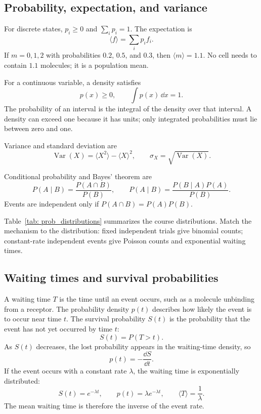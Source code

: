 \subsection{Probability, expectation, and variance}
\label{math:probability}

For discrete states, $p_i\geq0$ and $\sum_i p_i=1$.
The expectation is
\[
    \langle f\rangle=\sum_i p_i f_i.
\]
If $m=0,1,2$ with probabilities $0.2$, $0.5$, and $0.3$, then $\langle m\rangle=1.1$.
No cell needs to contain $1.1$ molecules; it is a population mean.

For a continuous variable, a density satisfies
\[
    p(x)\geq0, \qquad \int p(x)\,\dd x=1.
\]
The probability of an interval is the integral of the density over that interval.
A density can exceed one because it has units; only integrated probabilities must lie between zero and one.

Variance and standard deviation are
\[
    \operatorname{Var}(X)=\langle X^2\rangle-\langle X\rangle^2, \qquad \sigma_X=\sqrt{\operatorname{Var}(X)}.
\]

Conditional probability and Bayes' theorem are
\[
    P(A\mid B)=\frac{P(A\cap B)}{P(B)}, \qquad P(A\mid B)=\frac{P(B\mid A)P(A)}{P(B)}.
\]
Events are independent only if $P(A\cap B)=P(A)P(B)$.

Table~\ref{tab: prob_distributions} summarizes the course distributions.
Match the mechanism to the distribution: fixed independent trials give binomial counts; constant-rate independent events give Poisson counts and exponential waiting times.


\subsection{Waiting times and survival probabilities}
\label{math:survival}

A waiting time $T$ is the time until an event occurs, such as a molecule unbinding from a receptor.
The probability density $p(t)$ describes how likely the event is to occur near time $t$.
The survival probability $S(t)$ is the probability that the event has not yet occurred by time $t$:
\[
    S(t)=P(T>t).
\]
As $S(t)$ decreases, the lost probability appears in the waiting-time density, so
\[
    p(t)=-\frac{\dd S}{\dd t}.
\]
If the event occurs with a constant rate $\lambda$, the waiting time is exponentially distributed:
\[
    S(t)=e^{-\lambda t}, \qquad p(t)=\lambda e^{-\lambda t}, \qquad \langle T\rangle=\frac{1}{\lambda}.
\]
The mean waiting time is therefore the inverse of the event rate.

